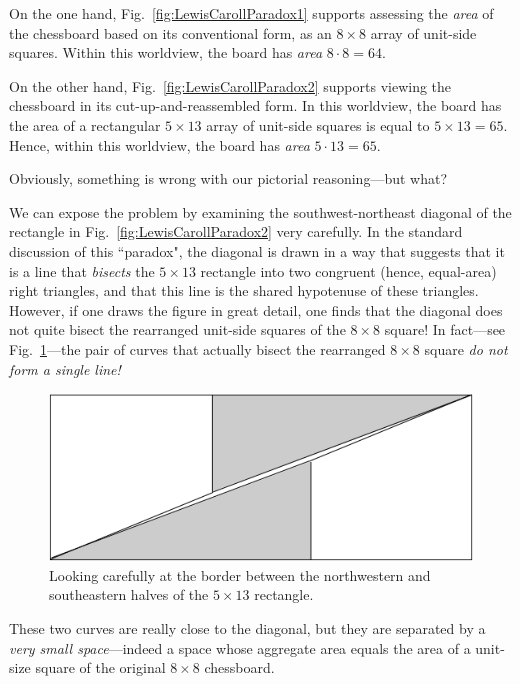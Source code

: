 On the one hand, Fig.~\ref{fig:LewisCarollParadox1} supports assessing the {\em area} of the chessboard based on its conventional form, as an $8 \times 8$ array of unit-side squares.  Within this worldview, the board has {\em area} $8 \cdot 8 = 64$.

\smallskip

On the other hand, Fig.~\ref{fig:LewisCarollParadox2} supports viewing the chessboard in its cut-up-and-reassembled form.  In this worldview, the board has the area of a rectangular $5 \times 13$ array of unit-side squares is equal to $5 \times 13 = 65$.  Hence, within this worldview, the board has {\em area} $5 \cdot 13 = 65$.

\medskip

Obviously, something is wrong with our pictorial reasoning---but what?

\medskip

We can expose the problem by examining the southwest-northeast diagonal of the rectangle in Fig.~\ref{fig:LewisCarollParadox2} very carefully.  In the standard discussion of this ``paradox", the diagonal is drawn in a way that suggests that it is a line that {\em bisects} the $5 \times 13$ rectangle into two congruent (hence, equal-area) right triangles, and that this line is the shared hypotenuse of these triangles.  However, if one draws the figure in great detail, one finds that the diagonal does not quite bisect the rearranged unit-side squares of the $8 \times 8$ square!  In fact---see Fig.~\ref{fig:LewisCarollParadoxSol}---the pair of curves that actually bisect the rearranged $8 \times 8$ square {\em do not form a single line!}
\begin{figure}[ht]
\begin{center}
       \includegraphics[scale=0.5]{FiguresMaths/LewisCarollParadoxSolution}
\caption{Looking carefully at the border between the northwestern and southeastern halves of the $5 \times 13$ rectangle.}
       \label{fig:LewisCarollParadoxSol}
\end{center}
\end{figure}
These two curves are really close to the diagonal, but they are separated by a {\em very small space}---indeed a space whose aggregate area equals the area of a unit-size square of the original $8 \times 8$ chessboard.

